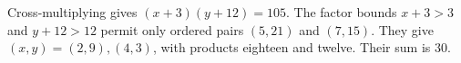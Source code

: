 Cross-multiplying gives $(x+3)(y+12)=105$. The factor bounds $x+3>3$ and $y+12>12$ permit only ordered pairs $(5,21)$ and $(7,15)$. They give $(x,y)=(2,9),(4,3)$, with products eighteen and twelve. Their sum is $\boxed{30}$.
